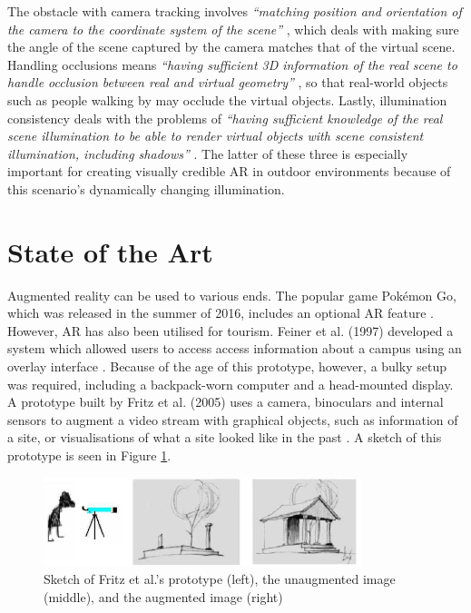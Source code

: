 The obstacle with camera tracking involves \textit{“matching position and orientation of the camera to the coordinate system of the scene”} \cite{Lal2010}, which deals with making sure the angle of the scene captured by the camera matches that of the virtual scene. Handling occlusions means \textit{“having sufficient 3D information of the real scene to handle occlusion between real and virtual geometry”} \cite{Lal2010}, so that real-world objects such as people walking by may occlude the virtual objects. Lastly, illumination consistency deals with the problems of \textit{“having sufficient knowledge of the real scene illumination to be able to render virtual objects with scene consistent illumination, including shadows”} \cite{Lal2010}. The latter of these three is especially important for creating visually credible AR in outdoor environments because of this scenario’s dynamically changing illumination.

\section{State of the Art}
Augmented reality can be used to various ends. The popular game Pokémon Go, which was released in the summer of 2016, includes an optional AR feature \cite{Pokemon}. However, AR has also been utilised for tourism. Feiner et al. (1997) developed a system which allowed users to access access information about a campus using an overlay interface \cite{Feiner1997}. Because of the age of this prototype, however, a bulky setup was required, including a backpack-worn computer and a head-mounted display. A prototype built by Fritz et al. (2005) uses a camera, binoculars and internal sensors to augment a video stream with graphical objects, such as information of a site, or visualisations of what a site looked like in the past \cite{Fritz2005}. A sketch of this prototype is seen in Figure \ref{fig:binoculars}.

\begin{figure}[h!]
    \centering
    \includegraphics[scale=0.7]{figures/binoc.png}
    \caption{Sketch of Fritz et al.'s prototype (left), the unaugmented image (middle), and the augmented image (right) \cite{Fritz2005}}\label{fig:binoculars}
\end{figure}

